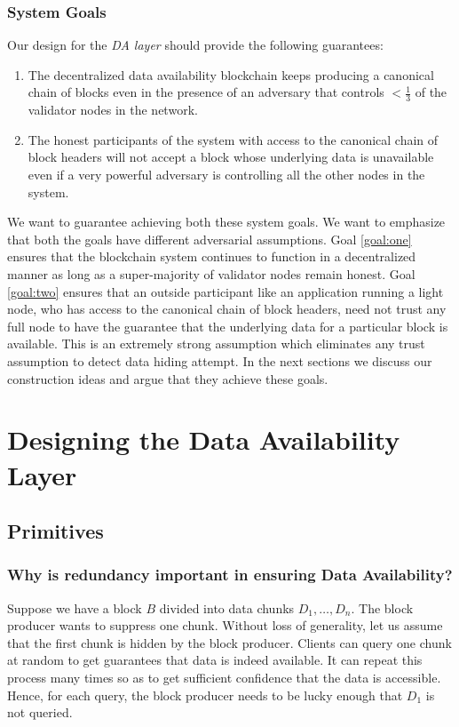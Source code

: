 \documentclass[sigconf, screen=true, nonacm]{acmart}
\newcommand{\DA}{\textit{DA layer}}
\begin{document}
        \subsubsection{System Goals}\label{goals}
            Our design for the \DA{} should provide the following guarantees:
            \begin{enumerate}
                \item \label{goal:one} The decentralized data availability blockchain keeps producing a canonical chain of blocks even in the presence of an adversary that controls $<\!\!\frac{1}{3}$ of the validator nodes in the network. 
                \item \label{goal:two} The honest participants of the system with access to the canonical chain of block headers will not accept a block whose underlying data is unavailable even if a very powerful adversary is controlling all the other nodes in the system.
            \end{enumerate}
            We want to guarantee achieving both these system goals. We want to emphasize that both the goals have different adversarial assumptions. Goal \ref{goal:one} ensures that the blockchain system continues to function in a decentralized manner as long as a super-majority of validator nodes remain honest. Goal \ref{goal:two} ensures that an outside participant like an application running a light node, who has access to the canonical chain of block headers, need not trust any full node to have the guarantee that the underlying data for a particular block is available. This is an extremely strong assumption which eliminates any trust assumption to detect data hiding attempt. In the next sections we discuss our construction ideas and argue that they achieve these goals. 

\section{Designing the Data Availability Layer}
    \subsection{Primitives}
        \subsubsection{Why is redundancy important in ensuring Data Availability?}
            Suppose we have a block $B$ divided into data chunks $D_1, \dots, D_n$. The block producer wants to suppress one chunk. Without loss of generality, let us assume that the first chunk is hidden by the block producer. Clients can query one chunk at random to get guarantees that data is indeed available. It can repeat this process many times so as to get sufficient confidence that the data is accessible. Hence, for each query, the block producer needs to be lucky enough that $D_1$ is not queried.
\end{document}
